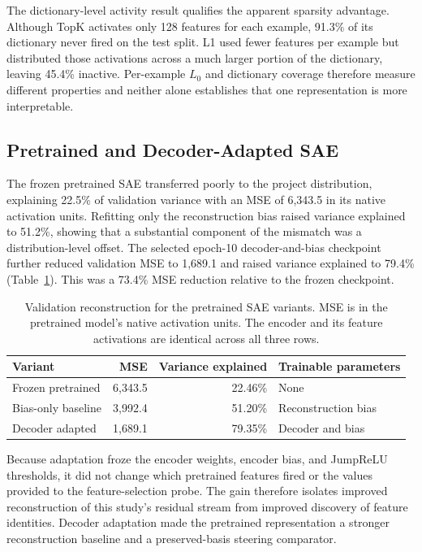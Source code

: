 The dictionary-level activity result qualifies the apparent sparsity
advantage.  Although TopK activates only 128 features for each example, 91.3\%
of its dictionary never fired on the test split.  L1 used fewer features per
example but distributed those activations across a much larger portion of the
dictionary, leaving 45.4\% inactive.  Per-example $L_0$ and dictionary
coverage therefore measure different properties and neither alone establishes
that one representation is more interpretable.

\subsection{Pretrained and Decoder-Adapted SAE}

The frozen pretrained SAE transferred poorly to the project distribution,
explaining 22.5\% of validation variance with an MSE of 6,343.5 in its native
activation units.  Refitting only the reconstruction bias raised variance
explained to 51.2\%, showing that a substantial component of the mismatch was
a distribution-level offset.  The selected epoch-10 decoder-and-bias
checkpoint further reduced validation MSE to 1,689.1 and raised variance
explained to 79.4\% (Table~\ref{tab:sae-pretrained-results}).  This was a 73.4\% MSE
reduction relative to the frozen checkpoint.

\begin{table}[htbp]
    \centering
    \caption{Validation reconstruction for the pretrained SAE variants. MSE is
    in the pretrained model's native activation units. The encoder and its
    feature activations are identical across all three rows.}
    \label{tab:sae-pretrained-results}
    \begin{tabular}{lrrl}
        \toprule
        Variant & MSE & Variance explained & Trainable parameters \\
        \midrule
        Frozen pretrained & 6,343.5 & 22.46\% & None \\
        Bias-only baseline & 3,992.4 & 51.20\% & Reconstruction bias \\
        Decoder adapted & 1,689.1 & 79.35\% & Decoder and bias \\
        \bottomrule
    \end{tabular}
\end{table}

Because adaptation froze the encoder weights, encoder bias, and JumpReLU
thresholds, it did not change which pretrained features fired or the values
provided to the feature-selection probe.  The gain therefore isolates improved
reconstruction of this study's residual stream from improved discovery of
feature identities.  Decoder adaptation made the pretrained representation a
stronger reconstruction baseline and a preserved-basis steering comparator.

